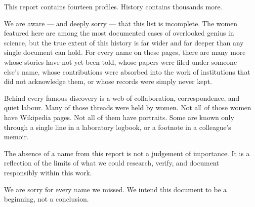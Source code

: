 \documentclass[12pt,a4paper]{article}
\begin{document}
\begin{tcolorbox}[motivationbox, title={To Every Woman We Did Not Name}]
This report contains fourteen profiles. History contains thousands more.

We are aware --- and deeply sorry --- that this list is incomplete. The women featured here are among the most documented cases of overlooked genius in science, but the true extent of this history is far wider and far deeper than any single document can hold. For every name on these pages, there are many more whose stories have not yet been told, whose papers were filed under someone else's name, whose contributions were absorbed into the work of institutions that did not acknowledge them, or whose records were simply never kept.

Behind every famous discovery is a web of collaboration, correspondence, and quiet labour. Many of those threads were held by women. Not all of those women have Wikipedia pages. Not all of them have portraits. Some are known only through a single line in a laboratory logbook, or a footnote in a colleague's memoir.

The absence of a name from this report is not a judgement of importance. It is a reflection of the limits of what we could research, verify, and document responsibly within this work.

We are sorry for every name we missed. We intend this document to be a beginning, not a conclusion.
\end{tcolorbox}

\vspace{16pt}
\end{document}
